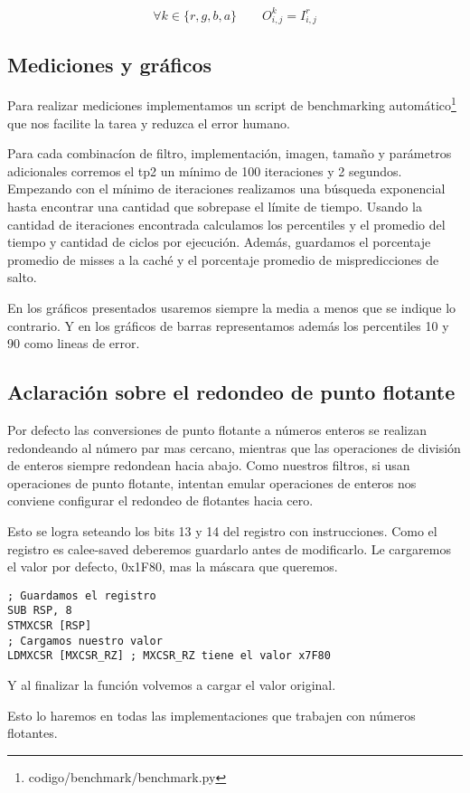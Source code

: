 $$\forall k \in \{r,g,b,a\} \qquad O^k_{i,j} = I^r_{i,j}$$

\subsection{Mediciones y gráficos}

Para realizar mediciones implementamos un script de benchmarking automático\footnote{codigo/benchmark/benchmark.py} que nos facilite la tarea y reduzca el error humano.

Para cada combinacíon de filtro, implementación, imagen, tamaño y parámetros adicionales corremos el tp2 un mínimo de 100 iteraciones y 2 segundos. Empezando con el mínimo de iteraciones realizamos una búsqueda exponencial hasta encontrar una cantidad que sobrepase el límite de tiempo. Usando la cantidad de iteraciones encontrada calculamos los percentiles y el promedio del tiempo y cantidad de ciclos por ejecución. Además, guardamos el porcentaje promedio de misses a la caché y el porcentaje promedio de mispredicciones de salto.

En los gráficos presentados usaremos siempre la media a menos que se indique lo contrario. Y en los gráficos de barras representamos además los percentiles 10 y 90 como lineas de error.

\subsection{Aclaración sobre el redondeo de punto flotante}

Por defecto las conversiones de punto flotante a números enteros se realizan redondeando al número par mas cercano\textsuperscript{\cite[Volume 1, Chapter 10.2.3]{intelsys}}, mientras que las operaciones de división de enteros siempre redondean hacia abajo.
Como nuestros filtros, si usan operaciones de punto flotante, intentan emular operaciones de enteros nos conviene configurar el redondeo de flotantes hacia cero.

Esto se logra seteando los bits 13 y 14 del registro  con instrucciones.
Como el registro es calee-saved deberemos guardarlo antes de modificarlo.
Le cargaremos el valor por defecto, 0x1F80, mas la máscara que queremos.

\begin{lstlisting}
; Guardamos el registro
SUB RSP, 8
STMXCSR [RSP]
; Cargamos nuestro valor
LDMXCSR [MXCSR_RZ] ; MXCSR_RZ tiene el valor x7F80
\end{lstlisting}

Y al finalizar la función volvemos a cargar el valor original.

Esto lo haremos en todas las implementaciones que trabajen con números flotantes.

